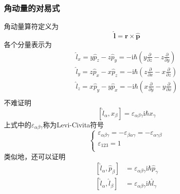 \subsubsection{角动量的对易式}
角动量算符定义为
$$
    \hat{\boldsymbol{l}} = \boldsymbol{r} \times \hat{\boldsymbol{p}}
$$
各个分量表示为
$$
    \begin{aligned}
        \hat{l}_{x} = y\hat{p}_z-z\hat{p}_y = -\mathrm{i}\hbar\left(y\frac{\partial }{\partial z} - z\frac{\partial }{\partial y}\right) \\
        \hat{l}_{y} = z\hat{p}_x-x\hat{p}_z = -\mathrm{i}\hbar\left(z\frac{\partial }{\partial x} - x\frac{\partial }{\partial z}\right) \\
        \hat{l}_{z} = x\hat{p}_y-y\hat{p}_x = -\mathrm{i}\hbar\left(x\frac{\partial }{\partial y} - y\frac{\partial }{\partial x}\right) \\
    \end{aligned}
$$
不难证明
\begin{equation}
    \left[\hat{l}_{\alpha}, x_{\beta}\right] = \varepsilon_{\alpha\beta\gamma}\mathrm{i}\hbar x_{\gamma}
\end{equation}
上式中的$\varepsilon_{\alpha\beta\gamma}$称为Levi-Civita符号
\begin{equation}\label{levi-civita}
    \begin{cases}
        \varepsilon_{\alpha\beta\gamma} = -\varepsilon_{\beta\alpha\gamma} = -\varepsilon_{\alpha\gamma\beta} \\
        \varepsilon_{123} = 1                                                                                 \\
    \end{cases}
\end{equation}
类似地，还可以证明
\begin{align}
    \left[\hat{l}_{\alpha}, \hat{p}_{\beta}\right] & = \varepsilon_{\alpha\beta\gamma}\mathrm{i}\hbar\hat{p}_{\gamma} \\
    \left[\hat{l}_{\alpha}, \hat{l}_{\beta}\right] & = \varepsilon_{\alpha\beta\gamma}\mathrm{i}\hbar\hat{l}_{\gamma}
\end{align}


